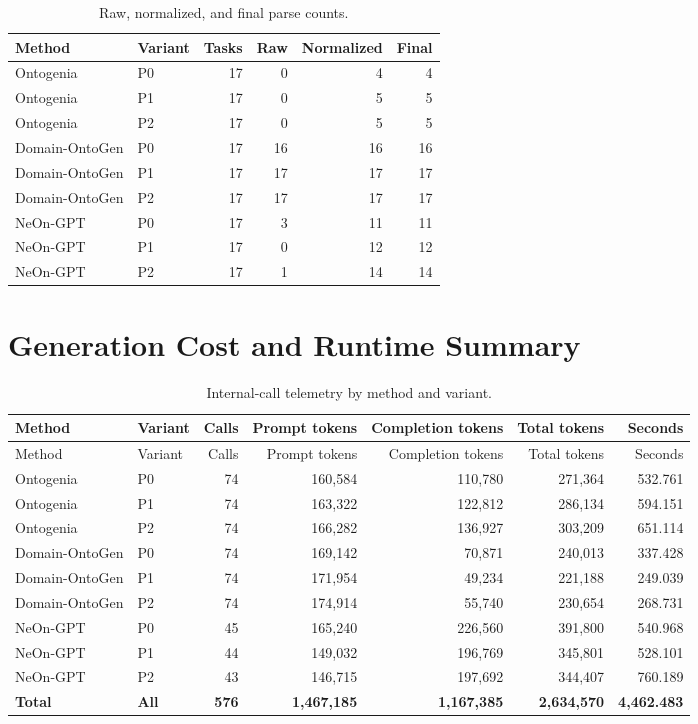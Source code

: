 \documentclass[11pt,a4paper]{article}
\begin{document}
\begin{table}[H]
\centering
\caption{Raw, normalized, and final parse counts.}
\small
\begin{tabular}{llrrrr}
\toprule
Method & Variant & Tasks & Raw & Normalized & Final \\
\midrule
Ontogenia & P0 & 17 & 0 & 4 & 4 \\
Ontogenia & P1 & 17 & 0 & 5 & 5 \\
Ontogenia & P2 & 17 & 0 & 5 & 5 \\
Domain-OntoGen & P0 & 17 & 16 & 16 & 16 \\
Domain-OntoGen & P1 & 17 & 17 & 17 & 17 \\
Domain-OntoGen & P2 & 17 & 17 & 17 & 17 \\
NeOn-GPT & P0 & 17 & 3 & 11 & 11 \\
NeOn-GPT & P1 & 17 & 0 & 12 & 12 \\
NeOn-GPT & P2 & 17 & 1 & 14 & 14 \\
\bottomrule
\end{tabular}
\end{table}

\section{Generation Cost and Runtime Summary}

{\scriptsize
\setlength{\tabcolsep}{3pt}
\begin{longtable}{llrrrrr}
\caption{Internal-call telemetry by method and variant.}\\
\toprule
Method & Variant & Calls & Prompt tokens & Completion tokens & Total tokens & Seconds \\
\midrule
\endfirsthead
\toprule
Method & Variant & Calls & Prompt tokens & Completion tokens & Total tokens & Seconds \\
\midrule
\endhead
Ontogenia & P0 & 74 & 160,584 & 110,780 & 271,364 & 532.761 \\
Ontogenia & P1 & 74 & 163,322 & 122,812 & 286,134 & 594.151 \\
Ontogenia & P2 & 74 & 166,282 & 136,927 & 303,209 & 651.114 \\
Domain-OntoGen & P0 & 74 & 169,142 & 70,871 & 240,013 & 337.428 \\
Domain-OntoGen & P1 & 74 & 171,954 & 49,234 & 221,188 & 249.039 \\
Domain-OntoGen & P2 & 74 & 174,914 & 55,740 & 230,654 & 268.731 \\
NeOn-GPT & P0 & 45 & 165,240 & 226,560 & 391,800 & 540.968 \\
NeOn-GPT & P1 & 44 & 149,032 & 196,769 & 345,801 & 528.101 \\
NeOn-GPT & P2 & 43 & 146,715 & 197,692 & 344,407 & 760.189 \\
\midrule
\textbf{Total} & \textbf{All} & \textbf{576} & \textbf{1,467,185} & \textbf{1,167,385} & \textbf{2,634,570} & \textbf{4,462.483} \\
\bottomrule
\end{longtable}
}



\end{document}
